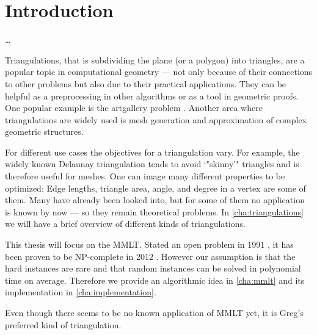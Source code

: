 \chapter{Introduction}
\ldots{}

Triangulations, that is subdividing the plane (or a polygon) into
triangles, are a popular topic in computational geometry --- not
only because of their connections to other problems but also due to
their practical applications. They can be helpful as a preprocessing 
in other algorithms
or as a tool in geometric proofs. One popular example is the
artgallery problem . Another area where triangulations
are widely used is mesh generation and approximation of complex
geometric structures. 

For different use cases the objectives for a triangulation vary. For
example, the widely known Delaunay triangulation
\cite[Section 9.2]{deberg_compgeom} tends to avoid `"skinny'"
triangles and is therefore useful for meshes. One can image many
different properties to be optimized: Edge lengths, triangle area,
angle, and degree in a vertex are some of them. Many have already
been looked into, but for some of them no application is known by
now --- so they remain theoretical problems. In
\cref{cha:triangulations} we will have a brief overview of different
kinds of triangulations.

This thesis will focus on the \gls{MMLT}. Stated an open problem in
1991 \cite{triangulation_minmax_length}, it has been proven to be
NP-complete in 2012 \cite{mmlt_complexity}. However our assumption
is that the hard instances are rare and that random instances can
be solved in polynomial time on average. Therefore we provide an
algorithmic idea in \cref{cha:mmlt} and its implementation in
\cref{cha:implementation}.

Even though there seems to be no known application of \gls{MMLT} yet,
it is Greg's \cite{greg} preferred kind of triangulation.


